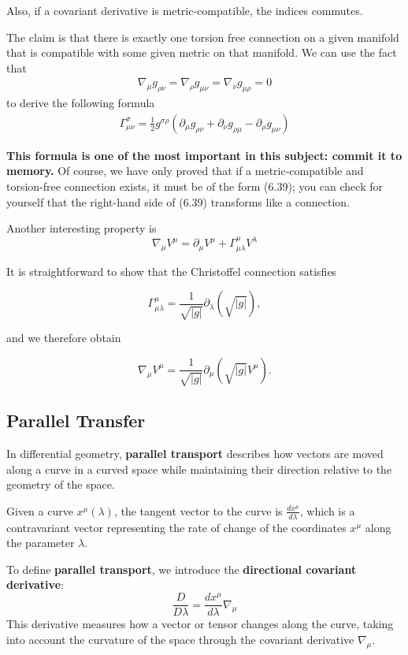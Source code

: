 \documentclass[12pt]{book}
\begin{document}
Also, if a covariant derivative is metric-compatible, the indices commutes. 

The claim is that there is exactly one torsion free connection on a given manifold that is compatible with some given metric on that manifold. We can use the fact that
\begin{align}
\nabla_{\mu} g_{\rho\nu} = \nabla_\rho g_{\mu\nu} = \nabla_\nu g_{\mu\rho} = 0
\end{align}
to derive the following formula
\begin{align}
\Gamma^\sigma_{\mu\nu} = \frac{1}{2} g^{\sigma\rho} \left( \partial_\mu g_{\rho\nu} + \partial_\nu g_{\rho\mu} - \partial_\rho g_{\mu\nu} \right)
\end{align}

\textbf{This formula is one of the most important in this subject: commit it to memory.} Of course, we have only proved that if a metric-compatible and torsion-free connection exists, it must be of the form (6.39); you can check for yourself that the right-hand side of (6.39) transforms like a connection.

Another interesting property is
\[
\nabla_\mu V^\mu = \partial_\mu V^\mu + \Gamma^\mu_{\mu\lambda} V^\lambda
\]

It is straightforward to show that the Christoffel connection satisfies

\[
\Gamma^\mu_{\mu\lambda} = \frac{1}{\sqrt{|g|}} \partial_\lambda (\sqrt{|g|}),
\]

and we therefore obtain

\[
\nabla_\mu V^\mu = \frac{1}{\sqrt{|g|}} \partial_\mu (\sqrt{|g|} V^\mu).
\]



\subsection{Parallel Transfer}
In differential geometry, \textbf{parallel transport} describes how vectors are moved along a curve in a curved space while maintaining their direction relative to the geometry of the space. 

Given a curve \( x^\mu(\lambda) \), the tangent vector to the curve is \( \frac{dx^\mu}{d\lambda} \), which is a contravariant vector representing the rate of change of the coordinates \( x^\mu \) along the parameter \( \lambda \).

To define \textbf{parallel transport}, we introduce the \textbf{directional covariant derivative}:
\[
\frac{D}{D\lambda} = \frac{dx^\mu}{d\lambda} \nabla_\mu
\]
This derivative measures how a vector or tensor changes along the curve, taking into account the curvature of the space through the covariant derivative \( \nabla_\mu \).
\end{document}
